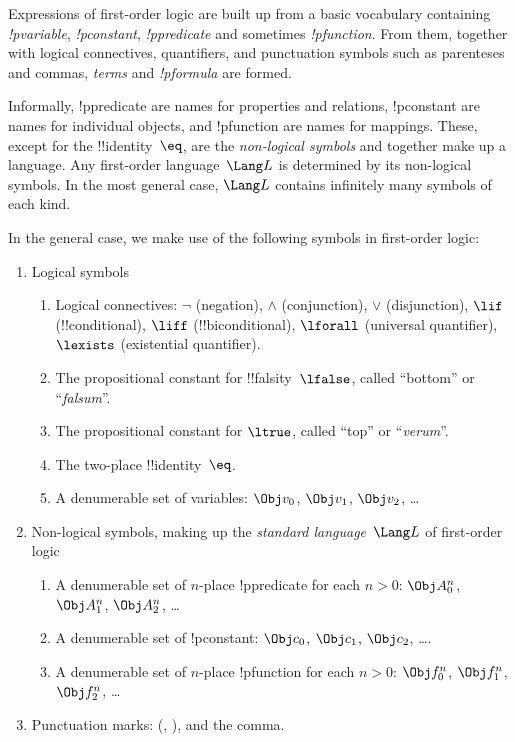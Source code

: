 \documentclass[../../include/open-logic-section]{subfiles}
\begin{document}


\begin{wordy}
Expressions of first-order logic are built up from a basic vocabulary
containing \emph{!p{variable}}, \emph{!p{constant}},
\emph{!p{predicate}} and sometimes \emph{!p{function}}.
  From them, together with logical connectives, quantifiers, and
  punctuation symbols such as parenteses and commas, \emph{terms} and
  \emph{!p{formula}} are formed.

Informally, !p{predicate} are names for properties and relations,
!p{constant} are names for individual objects, and !p{function} are names
for mappings.  These, except for the !!{identity}~$\eq$, are the
\emph{non-logical symbols} and together make up a language.  Any
first-order language~$\Lang L$ is determined by its non-logical
symbols.  In the most general case, $\Lang L$ contains infinitely
many symbols of each kind.
\end{wordy}

In the general case, we make use of the following symbols in
first-order logic:

\begin{enumerate}
\item Logical symbols
\begin{enumerate}
\item Logical connectives: $\lnot$ (negation), $\land$ (conjunction),
  $\lor$ (disjunction), $\lif$ (!!{conditional}), $\liff$ (!!{biconditional}),
  $\lforall$ (universal quantifier), $\lexists$ (existential
  quantifier).
\item The propositional constant for !!{falsity}~$\lfalse$, called ``bottom'' or ``\emph{falsum}''.
\item The propositional constant for $\ltrue$, called ``top'' or ``\emph{verum}''.
\item The two-place !!{identity}~$\eq$.
\item A denumerable set of variables: $\Obj v_0$, $\Obj v_1$, $\Obj
  v_2$, \dots
\end{enumerate}
\item Non-logical symbols, making up the \emph{standard
  language}~$\Lang L$ of first-order logic
\begin{enumerate}
\item A denumerable set of $n$-place !p{predicate} for each $n>0$: $\Obj
  A^n_0$, $\Obj A^n_1$, $\Obj A^n_2$, \dots
\item A denumerable set of !p{constant}: $\Obj c_0$, $\Obj c_1$, $\Obj
  c_2$, \dots.
\item A denumerable set of $n$-place !p{function} for each $n>0$:
  $\Obj f^n_0$, $\Obj f^n_1$, $\Obj f^n_2$, \dots
\end{enumerate}
\item Punctuation marks: (, ), and the comma.
\end{enumerate}
\end{document}

